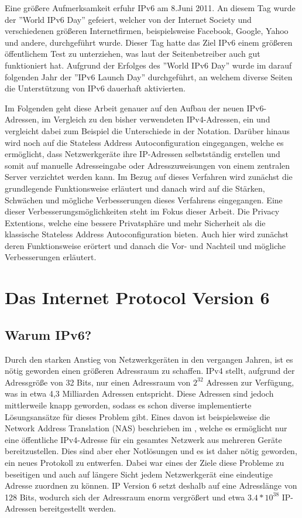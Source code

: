 \documentclass[a4paper, 12pt]{scrartcl}
\begin{document}
Eine größere Aufmerksamkeit erfuhr IPv6 am 8.Juni 2011. An diesem Tag wurde der ''World IPv6 Day'' \cite{inetSoc}  gefeiert, welcher von der Internet Society und verschiedenen größeren Internetfirmen, beispielsweise Facebook, Google, Yahoo und andere, durchgeführt wurde. Dieser Tag hatte das Ziel IPv6 einem größeren öffentlichem Test zu unterziehen, was laut der Seitenbetreiber auch gut funktioniert hat.
Aufgrund der Erfolges des ''World IPv6 Day'' wurde im darauf folgenden Jahr der ''IPv6 Launch Day'' \cite{ipLaunch} durchgeführt, an welchem diverse Seiten die Unterstützung von IPv6 dauerhaft aktivierten.

Im Folgenden geht diese Arbeit genauer auf den Aufbau der neuen IPv6-Adressen, im Vergleich zu den bisher verwendeten IPv4-Adressen, ein und vergleicht dabei zum Beispiel die Unterschiede in der Notation.
Darüber hinaus wird noch auf die Stateless Address Autoconfiguration eingegangen, welche es ermöglicht, dass Netzwerkgeräte ihre IP-Adressen selbstständig erstellen und somit auf manuelle Adresseingabe oder Adresszuweisungen von einem zentralen Server verzichtet werden kann. 
Im Bezug auf dieses Verfahren wird zunächst die grundlegende Funktionsweise erläutert und danach wird auf die Stärken, Schwächen und mögliche Verbesserungen dieses Verfahrens eingegangen. 
Eine dieser Verbesserungsmöglichkeiten steht im Fokus dieser Arbeit. Die Privacy Extentions, welche eine bessere Privatsphäre und mehr Sicherheit als die klassische Stateless Address Autoconfiguration bieten.
Auch hier wird zunächst deren Funktionsweise erörtert und danach die Vor- und Nachteil und mögliche Verbesserungen erläutert.

\newpage



\section{Das Internet Protocol Version 6}
\subsection{Warum IPv6?}
Durch den starken Anstieg von Netzwerkgeräten in den vergangen Jahren, ist es nötig geworden einen größeren Adressraum zu schaffen.
IPv4  stellt, aufgrund der Adressgröße von 32 Bits, nur einen Adressraum von $2^{32}$ Adressen zur Verfügung, was in etwa 4,3 Milliarden Adressen entspricht. 
Diese Adressen sind jedoch mittlerweile knapp geworden, sodass es schon diverse implementierte Lösungsansätze für dieses Problem gibt. 
Eines davon ist beispielsweise die Network Address Translation (NAS) beschrieben im \cite{rfc3022}, welche es ermöglicht nur eine öffentliche IPv4-Adresse für ein gesamtes Netzwerk aus mehreren Geräte bereitzustellen.
Dies sind aber eher Notlösungen und es ist daher nötig geworden, ein neues Protokoll zu entwerfen.
Dabei war eines der Ziele diese Probleme zu beseitigen und auch auf längere Sicht jedem Netzwerkgerät eine eindeutige Adresse zuordnen zu können.
IP Version 6 setzt deshalb auf eine Adresslänge von 128 Bits, wodurch sich der Adressraum enorm vergrößert und etwa $3.4*10^{38}$ IP-Adressen bereitgestellt werden. 
\end{document}
